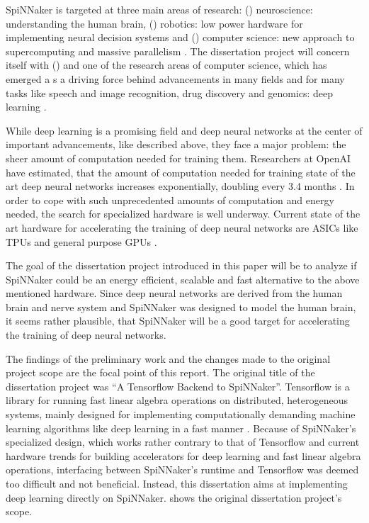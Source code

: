\documentclass{article}
\begin{document}
SpiNNaker is targeted at three main areas of research:
() neuroscience: understanding the human
brain, () robotics: low power hardware for
implementing neural decision systems and
() computer science: new approach to
supercomputing and massive parallelism \citep{spinn_proj}.
The dissertation project will concern itself with ()
and one of the research areas of computer science, which has emerged a
s a driving force behind advancements in many fields and for many
tasks like speech and image recognition, drug discovery and genomics:
deep learning \citep{lecun_et_al_2015}.

While deep learning is a promising field and deep neural
networks at the center of important advancements, like
described above, they face a major problem: the sheer
amount of computation needed for training them.
Researchers at OpenAI have estimated, that the amount of
computation needed for training state of the art deep
neural networks increases exponentially, doubling every
3.4 months \citep{openai2019}.
In order to cope with such unprecedented amounts of
computation and energy needed, the search for specialized
hardware is well underway.
Current state of the art hardware for accelerating the
training of deep neural networks are ASICs like TPUs and
general purpose GPUs \citep{tpus, mittal_et_al_2019}.

The goal of the dissertation project introduced in this paper will be
to analyze if SpiNNaker could be an energy efficient, scalable and
fast alternative to the above mentioned hardware.
Since deep neural networks are derived from the human
brain and nerve system \citep{goodfellow2016} and SpiNNaker
was designed to model the human brain, it seems rather
plausible, that SpiNNaker will be a good target for
accelerating the training of deep neural networks.

The findings of the preliminary work and the changes made
to the original project scope are the focal point of this
report.
The original title of the dissertation project was ``A
Tensorflow Backend to SpiNNaker''.
Tensorflow is a library for running fast linear algebra operations on
distributed, heterogeneous systems, mainly designed for implementing
computationally demanding machine learning algorithms like deep
learning in a fast manner \citep{tf2015}.
Because of SpiNNaker's specialized design, which works
rather contrary to that of Tensorflow and current hardware
trends for building accelerators for deep learning and fast linear
algebra operations, interfacing between SpiNNaker's runtime and
Tensorflow was deemed too difficult and not beneficial.
Instead, this dissertation aims at implementing deep
learning directly on SpiNNaker.
\citet{proj} shows the original dissertation project's
scope.
\end{document}
